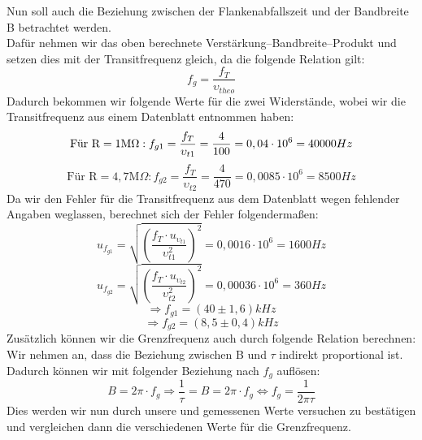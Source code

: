 Nun soll auch die Beziehung zwischen der Flankenabfallszeit und der Bandbreite B betrachtet werden. \\
Dafür nehmen wir das oben berechnete Verstärkung–Bandbreite–Produkt und setzen dies mit der Transitfrequenz gleich, da die folgende Relation gilt:\\
\begin{equation}
f_g=\frac{f_T}{\upsilon_{theo}}
\end{equation}
Dadurch bekommen wir folgende Werte für die zwei Widerstände, wobei wir die Transitfrequenz aus einem Datenblatt entnommen haben:\\
\begin{equation}
\text{Für R} =1 \text{M} \Omega: f_{g1}=\frac{f_T}{\upsilon_{t1}}=\frac{4}{100}=0,04\cdot 10^6=40000Hz\\
\end{equation}
\begin{equation}
\text{Für R} =4,7 \text{M} \Omega: f_{g2}=\frac{f_T}{\upsilon_{t2}}=\frac{4}{470}=0,0085\cdot 10^6=8500Hz
\end{equation}
Da wir den Fehler für die Transitfrequenz aus dem Datenblatt wegen fehlender Angaben weglassen, berechnet sich der Fehler folgendermaßen:\\
\begin{equation}
u_{f_{g1}}=\sqrt{(\frac{f_T \cdot u_{\upsilon_{t1}}}{\upsilon_{t1}^2})^2}=0,0016\cdot 10^6=1600Hz
\end{equation}
\begin{equation}
u_{f_{g2}}=\sqrt{(\frac{f_T \cdot u_{\upsilon_{t2}}}{\upsilon_{t2}^2})^2}=0,00036\cdot 10^6=360Hz
\end{equation}
\begin{equation}
\Rightarrow f_{g1}=(40\pm1,6)kHz
\end{equation}
\begin{equation}
\Rightarrow f_{g2}=(8,5\pm0,4)kHz
\end{equation}
Zusätzlich können wir die Grenzfrequenz auch durch folgende Relation berechnen: Wir nehmen an, dass die Beziehung zwischen B und $\tau$ indirekt proportional ist. Dadurch können wir mit folgender Beziehung nach $f_g$ auflösen:\\
\begin{equation}
B=2\pi\cdot f_g \Rightarrow \frac{1}{\tau}=B=2\pi\cdot f_g \Leftrightarrow  f_g=\frac{1}{2\pi \tau}
\end{equation}
 Dies werden wir nun durch unsere und gemessenen Werte versuchen zu bestätigen und vergleichen dann die verschiedenen Werte für die Grenzfrequenz. \\
